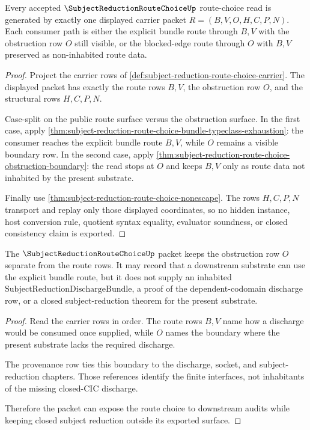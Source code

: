 \begin{theorem}
\label{thm:subject-reduction-route-choice-constructor-exhaustion}
Every accepted $\SubjectReductionRouteChoiceUp$ route-choice read is generated by exactly one displayed carrier packet $R=(B,V,O,H,C,P,N)$. Each consumer path is either the explicit bundle route through $B,V$ with the obstruction row $O$ still visible, or the blocked-edge route through $O$ with $B,V$ preserved as non-inhabited route data.
\end{theorem}
\begin{proof}
Project the carrier rows of \autoref{def:subject-reduction-route-choice-carrier}. The displayed packet has exactly the route rows $B,V$, the obstruction row $O$, and the structural rows $H,C,P,N$.

Case-split on the public route surface versus the obstruction surface. In the first case, apply \autoref{thm:subject-reduction-route-choice-bundle-typeclass-exhaustion}: the consumer reaches the explicit bundle route $B,V$, while $O$ remains a visible boundary row. In the second case, apply \autoref{thm:subject-reduction-route-choice-obstruction-boundary}: the read stops at $O$ and keeps $B,V$ only as route data not inhabited by the present substrate.

Finally use \autoref{thm:subject-reduction-route-choice-nonescape}. The rows $H,C,P,N$ transport and replay only those displayed coordinates, so no hidden instance, host conversion rule, quotient syntax equality, evaluator soundness, or closed consistency claim is exported.
\end{proof}

\begin{theorem}
\label{thm:subject-reduction-route-choice-obstruction-boundary}
The $\SubjectReductionRouteChoiceUp$ packet keeps the obstruction row $O$ separate from the route rows. It may record that a downstream substrate can use the explicit bundle route, but it does not supply an inhabited $\mathrm{SubjectReductionDischargeBundle}$, a proof of the dependent-codomain discharge row, or a closed subject-reduction theorem for the present substrate.
\end{theorem}
\begin{proof}
Read the carrier rows in order. The route rows $B,V$ name how a discharge would be consumed once supplied, while $O$ names the boundary where the present substrate lacks the required discharge.

The provenance row ties this boundary to the discharge, socket, and subject-reduction chapters. Those references identify the finite interfaces, not inhabitants of the missing closed-CIC discharge.

Therefore the packet can expose the route choice to downstream audits while keeping closed subject reduction outside its exported surface.
\end{proof}


